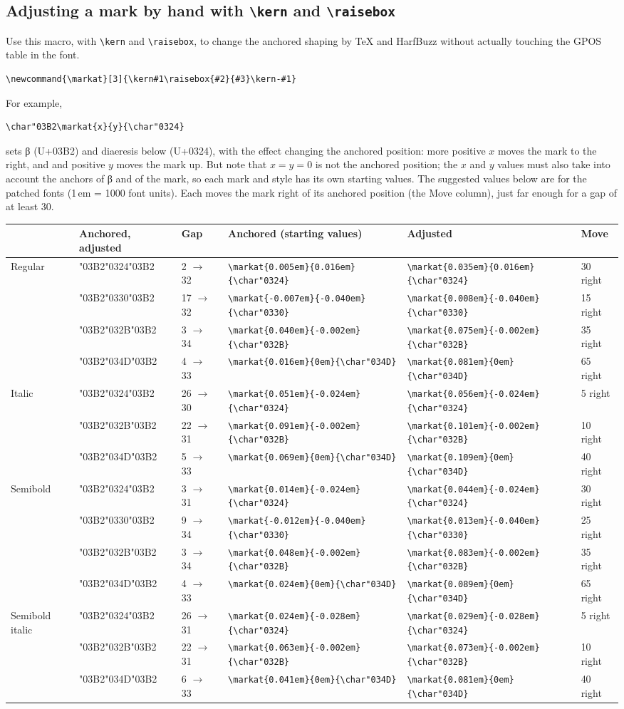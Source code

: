 \documentclass[landscape]{article}
\begin{document}
\subsection*{Adjusting a mark by hand with \texttt{\textbackslash kern} and \texttt{\textbackslash raisebox}}

Use this macro, with \verb|\kern| and \verb|\raisebox|,
to change the anchored shaping by TeX and HarfBuzz without actually touching the GPOS table in the font.
\begin{verbatim}
\newcommand{\markat}[3]{\kern#1\raisebox{#2}{#3}\kern-#1}
\end{verbatim}
For example,
\begin{verbatim}
\char"03B2\markat{x}{y}{\char"0324}
\end{verbatim}
sets β (U+03B2) and diaeresis below (U+0324), with the effect changing the anchored position:
more positive $x$ moves the mark to the right, and and positive $y$ moves the mark up. 
But note that $x = y = 0$ is not the anchored position; 
the $x$ and $y$ values must also take into account the anchors of β and of the mark, 
so each mark and style has its own starting values.
The suggested values below are for the patched fonts (1\,em = 1000 font units).
Each moves the mark right of its anchored position (the Move column), just far enough for a gap of at least 30.

\medskip
\newcommand{\Bmk}[3]{\texttt{\textbackslash markat\{#1\}\{#2\}\{\textbackslash char\string"#3\}}}
\newcommand{\Bfix}[8]{{\LibertinusSerifPatch#1\Large\char"03B2\char"#2\quad\char"03B2\markat{#5}{#6}{\char"#2}} & #7 & \Bmk{#3}{#4}{#2} & \Bmk{#5}{#6}{#2} & #8 \\}
\renewcommand{\arraystretch}{1.5}
\begin{tabular}{l l l l l l}
	& Anchored, adjusted & Gap & Anchored (starting values) & Adjusted & Move \\ \hline
	Regular
	& \Bfix{\Bup}{0324}{0.005em}{0.016em}{0.035em}{0.016em}{2 $\to$ 32}{30 right}
	& \Bfix{\Bup}{0330}{-0.007em}{-0.040em}{0.008em}{-0.040em}{17 $\to$ 32}{15 right}
	& \Bfix{\Bup}{032B}{0.040em}{-0.002em}{0.075em}{-0.002em}{3 $\to$ 34}{35 right}
	& \Bfix{\Bup}{034D}{0.016em}{0em}{0.081em}{0em}{4 $\to$ 33}{65 right}
	Italic
	& \Bfix{\Bit}{0324}{0.051em}{-0.024em}{0.056em}{-0.024em}{26 $\to$ 30}{5 right}
	& \Bfix{\Bit}{032B}{0.091em}{-0.002em}{0.101em}{-0.002em}{22 $\to$ 31}{10 right}
	& \Bfix{\Bit}{034D}{0.069em}{0em}{0.109em}{0em}{5 $\to$ 33}{40 right}
	Semibold
	& \Bfix{\Bbf}{0324}{0.014em}{-0.024em}{0.044em}{-0.024em}{3 $\to$ 31}{30 right}
	& \Bfix{\Bbf}{0330}{-0.012em}{-0.040em}{0.013em}{-0.040em}{9 $\to$ 34}{25 right}
	& \Bfix{\Bbf}{032B}{0.048em}{-0.002em}{0.083em}{-0.002em}{3 $\to$ 34}{35 right}
	& \Bfix{\Bbf}{034D}{0.024em}{0em}{0.089em}{0em}{4 $\to$ 33}{65 right}
	Semibold italic
	& \Bfix{\Bbi}{0324}{0.024em}{-0.028em}{0.029em}{-0.028em}{26 $\to$ 31}{5 right}
	& \Bfix{\Bbi}{032B}{0.063em}{-0.002em}{0.073em}{-0.002em}{22 $\to$ 31}{10 right}
	& \Bfix{\Bbi}{034D}{0.041em}{0em}{0.081em}{0em}{6 $\to$ 33}{40 right}
\end{tabular}
\renewcommand{\arraystretch}{1}
\end{document}
